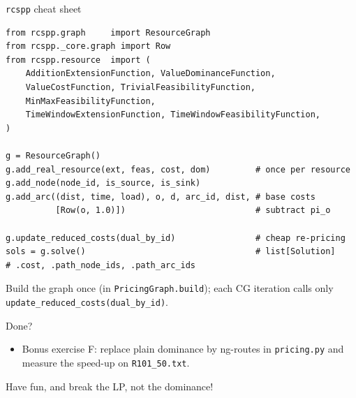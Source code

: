 \documentclass[10pt,aspectratio=169]{beamer}
\begin{document}
\begin{frame}[fragile]{\texttt{rcspp} cheat sheet}
\begin{lstlisting}[basicstyle=\ttfamily\tiny]
from rcspp.graph     import ResourceGraph
from rcspp._core.graph import Row
from rcspp.resource  import (
    AdditionExtensionFunction, ValueDominanceFunction,
    ValueCostFunction, TrivialFeasibilityFunction,
    MinMaxFeasibilityFunction,
    TimeWindowExtensionFunction, TimeWindowFeasibilityFunction,
)

g = ResourceGraph()
g.add_real_resource(ext, feas, cost, dom)         # once per resource
g.add_node(node_id, is_source, is_sink)
g.add_arc((dist, time, load), o, d, arc_id, dist, # base costs
          [Row(o, 1.0)])                          # subtract pi_o

g.update_reduced_costs(dual_by_id)                # cheap re-pricing
sols = g.solve()                                  # list[Solution]
# .cost, .path_node_ids, .path_arc_ids
\end{lstlisting}
  \alert{Build the graph once} (in \texttt{PricingGraph.build}); each CG
  iteration calls only \texttt{update\_reduced\_costs(dual\_by\_id)}.
\end{frame}

\begin{frame}{Done?}
  \begin{itemize}\small
    \item Bonus exercise \alert{F}: replace plain dominance by
          \alert{ng-routes} in \texttt{pricing.py} and measure the
          speed-up on \texttt{R101\_50.txt}.
  \end{itemize}
  \vfill
  \centering Have fun, and break the LP, not the dominance!
\end{frame}
\end{document}
